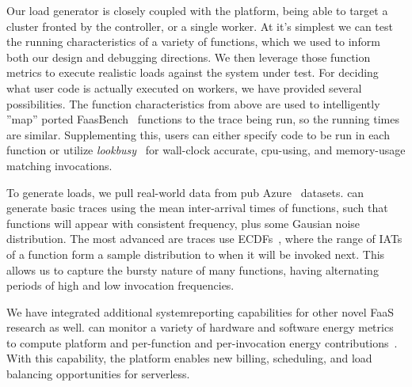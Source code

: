 Our load generator is closely coupled with the platform, being able to target a cluster fronted by the controller, or a single worker.
At it's simplest we can test the running characteristics of a variety of functions, which we used to inform both our design and debugging directions.
We then leverage those function metrics to execute realistic loads against the system under test.
For deciding what user code is actually executed on workers, we have provided several possibilities.
The function characteristics from above are used to intelligently ''map'' ported FaasBench~\cite{} functions to the trace being run, so the running times are similar.
Supplementing this, users can either specify code to be run in each function or utilize \emph{lookbusy}~\cite{} for wall-clock accurate, cpu-using, and memory-usage matching invocations.


To generate loads, we pull real-world data from pub Azure~\cite{} datasets.
\sysname{} can generate basic traces using the mean inter-arrival times of functions, such that functions will appear with consistent frequency, plus some Gausian noise distribution.
The most advanced are traces use ECDFs~\cite{}, where the range of IATs of a function form a sample distribution to when it will be invoked next.
This allows us to capture the bursty nature of many functions, having alternating periods of high and low invocation frequencies.

We have integrated additional systemreporting capabilities for other novel FaaS research as well.
\sysname{} can monitor a variety of hardware and software energy metrics to compute platform and per-function and per-invocation energy contributions~\cite{}.
With this capability, the platform enables new billing, scheduling, and load balancing opportunities for serverless.

